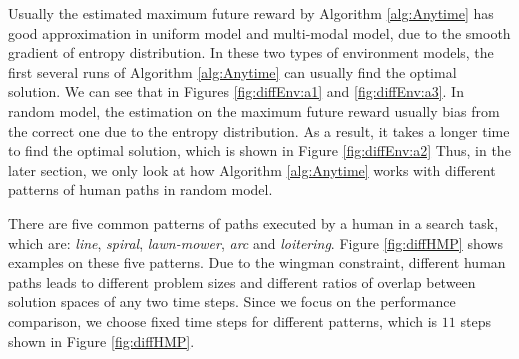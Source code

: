 \documentclass[12pt]{article}
\begin{document}
Usually the estimated maximum future reward by Algorithm \ref{alg:Anytime} has good approximation in uniform model and multi-modal model, due to the smooth gradient of entropy distribution. 
In these two types of environment models, the first several runs of Algorithm \ref{alg:Anytime} can usually find the optimal solution.
We can see that in Figures \ref{fig:diffEnv:a1} and \ref{fig:diffEnv:a3}.
In random model, the estimation on the maximum future reward usually bias from the correct one due to the entropy distribution.
As a result, it takes a longer time to find the optimal solution, which is shown in Figure \ref{fig:diffEnv:a2}
Thus, in the later section, we only look at how Algorithm \ref{alg:Anytime} works with different patterns of human paths in random model.

There are five common patterns of paths executed by a human in a search task, which are:
\emph{line}, \emph{spiral}, \emph{lawn-mower}, \emph{arc} and \emph{loitering}.
Figure \ref{fig:diffHMP} shows examples on these five patterns.
Due to the wingman constraint, different human paths leads to different problem sizes and different ratios of overlap between solution spaces of any two time steps.
Since we focus on the performance comparison, we choose fixed time steps for different patterns, which is $ 11 $ steps shown in Figure \ref{fig:diffHMP}. 
\end{document}
